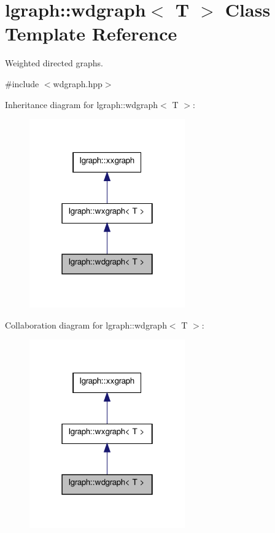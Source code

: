 \hypertarget{classlgraph_1_1wdgraph}{\section{lgraph\-:\-:wdgraph$<$ T $>$ Class Template Reference}
\label{classlgraph_1_1wdgraph}
}


Weighted directed graphs.  




{\ttfamily \#include $<$wdgraph.\-hpp$>$}



Inheritance diagram for lgraph\-:\-:wdgraph$<$ T $>$\-:
\nopagebreak
\begin{figure}[H]
\begin{center}
\leavevmode
\includegraphics[width=190pt]{classlgraph_1_1wdgraph__inherit__graph}
\end{center}
\end{figure}


Collaboration diagram for lgraph\-:\-:wdgraph$<$ T $>$\-:
\nopagebreak
\begin{figure}[H]
\begin{center}
\leavevmode
\includegraphics[width=190pt]{classlgraph_1_1wdgraph__coll__graph}
\end{center}
\end{figure}
